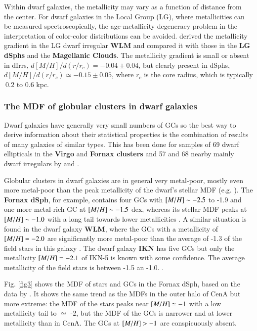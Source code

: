 \documentclass{aa}
\begin{document}
Within dwarf galaxies, the metallicity may vary as a function of distance from the center.
For dwarf galaxies in the Local Group (LG), where metallicities can be
measured spectroscopically, the age-metallicity degeneracy problem in the interpretation of 
color-color distributions can be avoided.  
\citet{leaman13} derived the metallicity gradient in the LG dwarf irregular {\bf WLM} and compared it with 
those in the {\bf LG dSphs} and the {\bf Magellanic Clouds}. 
The metallicity 
gradient is small or absent in dIrrs, $d[M/H]/d(r/r_c) = -0.04 \pm 0.04$, but clearly present in dSphs,
$d[M/H]/d(r/r_c) \simeq -0.15 \pm 0.05$, where $r_c$ is the core radius, which is typically $~ 0.2$ to 0.6 kpc.    

\subsubsection{The MDF of globular clusters in dwarf galaxies}  \label{sec:2.2.2}


Dwarf galaxies have generally very small numbers of GCs so the best way to
derive information about their statistical properties is the combination of
results of many galaxies of similar types.
This has been done for samples of 69 dwarf ellipticals in the {\bf Virgo} and
{\bf Fornax clusters} \citep{miller07} and 57 and 68 nearby mainly dwarf irregulars  
by \citet{sharina05} and \citet{georgiev09}.

Globular clusters in dwarf galaxies are in general very metal-poor, mostly even more
metal-poor than the peak metallicity of the dwarf's stellar MDF
(e.g. \citet{mackey04, sharina10}). 
The {\bf Fornax dSph}, for example,
contains four GCs with $\mbox{$[M/H]$} \sim-2.5$ to -1.9 and one more metal-rich GC
at $\mbox{$[M/H]$} \sim-1.5$ dex, whereas its stellar MDF peaks
at $\mbox{$[M/H]$} \sim-1.0$ with a long tail towards lower metallicities \citep{strader03, helmi06, larsen12b}. 
A similar situation is found in the dwarf galaxy {\bf WLM}, where the GCs
with a metallicity of  $\mbox{$[M/H]$} =-2.0$ are significantly more metal-poor than the
average of -1.3 of the field stars in this galaxy \citep{leaman13, larsen12}. The dwarf galaxy {\bf IKN} has five GCs but only the metallicity $\mbox{$[M/H]$} =-2.1$ of IKN-5 is known with some confidence. The average metallicity of the field stars is between -1.5 an -1.0. \citep{lianou10, georgiev10, larsen14}. 

Fig. \ref{fig3} shows the MDF of stars and GCs in the Fornax dSph, 
based on the data by \citet{larsen12b}. It shows the same trend as the MDFs in the outer halo of CenA but
more extreme: the MDF of the stars peaks near $\mbox{$[M/H]$} \simeq -1$ with a low metallicity  tail to $\simeq$ -2,
but the MDF of the GCs is narrower and at lower metallicity than in CenA. 
The GCs at $\mbox{$[M/H]$} > -1$ are conspicuously absent. 
\end{document}
